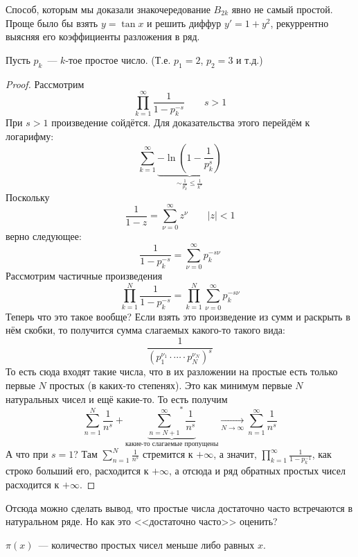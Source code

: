 \documentclass{article}
\begin{document}
    \begin{remark}
        Способ, которым мы доказали знакочередование $B_{2k}$ явно не самый простой. Проще было бы взять $y=\tan x$ и решить диффур $y'=1+y^2$, рекуррентно выясняя его коэффициенты разложения в ряд.
    \end{remark}
    \begin{claim}
        Пусть $p_k$~--- $k$-тое простое число. (Т.е. $p_1=2$, $p_2=3$ и т.д.)
    \end{claim}
    \begin{proof}
        Рассмотрим
        $$
        \prod\limits_{k=1}^\infty\frac1{1-p_k^{-s}}\qquad s>1
        $$
        При $s>1$ произведение сойдётся. Для доказательства этого перейдём к логарифму:
        $$
        \sum\limits_{k=1}^\infty\underbrace{-\ln\left(1-\frac1{p_k^s}\right)}_{\sim\frac1{p_k^s}\leqslant\frac1{k^s}}
        $$
        Поскольку
        $$
        \frac1{1-z}=\sum\limits_{\nu=0}^\infty z^\nu\qquad |z|<1
        $$
        верно следующее:
        $$
        \frac1{1-p_k^{-s}}=\sum\limits_{\nu=0}^\infty p_k^{-s\nu}
        $$
        Рассмотрим частичные произведения
        $$
        \prod\limits_{k=1}^N\frac1{1-p_k^{-s}}=\prod\limits_{k=1}^N\sum\limits_{\nu=0}^\infty p_k^{-s\nu}
        $$
        Теперь что это такое вообще? Если взять это произведение из сумм и раскрыть в нём скобки, то получится сумма слагаемых какого-то такого вида:
        $$
        \frac1{\left(p_1^{\nu_1}\cdot\cdots\cdot p_N^{\nu_N}\right)^s}
        $$
        То есть сюда входят такие числа, что в их разложении на простые есть только первые $N$ простых (в каких-то степенях). Это как минимум первые $N$ натуральных чисел и ещё какие-то. То есть получим
        $$
        \sum\limits_{n=1}^N\frac1{n^s}+\underbrace{{\sum\limits_{n=N+1}^\infty}^*\frac1{n^s}}_{\text{какие-то слагаемые пропущены}}\underset{N\to\infty}\longrightarrow\sum\limits_{n=1}^\infty\frac1{n^s}
        $$
        А что при $s=1$? Там $\sum\limits_{n=1}^N\frac1{n^s}$ стремится к $+\infty$, а значит, $\prod\limits_{k=1}^\infty\frac1{1-p_k^{-1}}$, как строко больший его, расходится к $+\infty$, а отсюда и ряд обратных простых чисел расходится к $+\infty$.
    \end{proof}
    \begin{remark}
        Отсюда можно сделать вывод, что простые числа достаточно часто встречаются в натуральном ряде. Но как это <<достаточно часто>> оценить?
    \end{remark}
    \begin{definition}
        $\pi(x)$~--- количество простых чисел меньше либо равных $x$.
    \end{definition}
\end{document}
